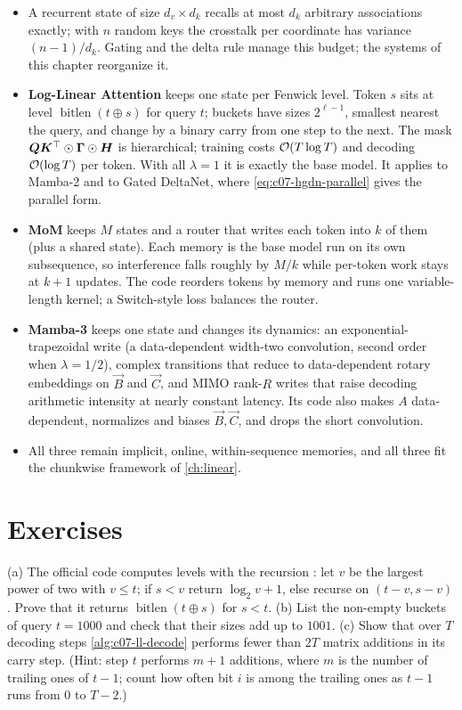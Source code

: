 \begin{summarybox}
\begin{itemize}
\item A recurrent state of size $d_v\times d_k$ recalls at most $d_k$ arbitrary associations
  exactly; with $n$ random keys the crosstalk per coordinate has variance $(n-1)/d_k$. Gating
  and the delta rule manage this budget; the systems of this chapter reorganize it.
\item \textbf{Log-Linear Attention} keeps one state per Fenwick level. Token $s$ sits at level
  $\operatorname{bitlen}(t\oplus s)$ for query $t$; buckets have sizes $2^{\ell-1}$, smallest
  nearest the query, and change by a binary carry from one step to the next. The mask
  $\bm{Q}\bm{K}^{\top}\odot\bm\Gamma\odot\bm{H}$ is hierarchical; training costs $\mathcal{O}(T\log T)$ and decoding
  $\mathcal{O}(\log T)$ per token. With all $\lambda = 1$ it is exactly the base model. It applies to
  Mamba-2 and to Gated DeltaNet, where \cref{eq:c07-hgdn-parallel} gives the parallel form.
\item \textbf{MoM} keeps $M$ states and a router that writes each token into $k$ of them
  (plus a shared state). Each memory is the base model run on its own subsequence, so
  interference falls roughly by $M/k$ while per-token work stays at $k+1$ updates. The code
  reorders tokens by memory and runs one variable-length kernel; a Switch-style loss
  balances the router.
\item \textbf{Mamba-3} keeps one state and changes its dynamics: an exponential-trapezoidal
  write (a data-dependent width-two convolution, second order when $\lambda = 1/2$), complex
  transitions that reduce to data-dependent rotary embeddings on $\vec B$ and $\vec C$, and
  MIMO rank-$R$ writes that raise decoding arithmetic intensity at nearly constant latency.
  Its code also makes $A$ data-dependent, normalizes and biases $\vec B,\vec C$, and drops
  the short convolution.
\item All three remain implicit, online, within-sequence memories, and all three fit the
  chunkwise framework of \cref{ch:linear}.
\end{itemize}
\end{summarybox}

\section*{Exercises}

\begin{exercise}\label{ex:c07-fenwick}
(a) The official code computes levels with the recursion :
let $v$ be the largest power of two with $v\le t$; if $s < v$ return $\log_2 v + 1$, else recurse on
$(t-v, s-v)$. Prove that it returns $\operatorname{bitlen}(t\oplus s)$ for $s < t$.
(b) List the non-empty buckets of query $t = 1000$ and check that their sizes add up to $1001$.
(c) Show that over $T$ decoding steps \cref{alg:c07-ll-decode} performs fewer than $2T$ matrix
additions in its carry step. (Hint: step $t$ performs $m+1$ additions, where $m$ is the number of
trailing ones of $t-1$; count how often bit $i$ is among the trailing ones as $t-1$ runs from $0$
to $T-2$.)
\end{exercise}

